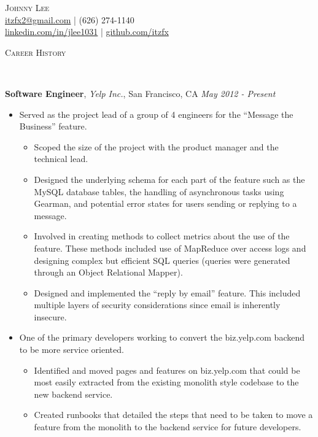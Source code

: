 \documentclass{article}
\newenvironment{changemargin}[2]{%
  \begin{list}{}{%
    \setlength{\topsep}{0pt}%
    \setlength{\leftmargin}{#1}%
    \setlength{\rightmargin}{#2}%
    \setlength{\listparindent}{\parindent}%
    \setlength{\itemindent}{\parindent}%
    \setlength{\parsep}{\parskip}%
  }%
  \item[]}{\end{list}
}
\newcommand{\lineover}{
  \begin{changemargin}{-0.05in}{-0.05in}
    \vspace*{-8pt}
    \hrulefill \\
    \vspace*{-2pt}
  \end{changemargin}
}
\newcommand{\header}[1]{
  \begin{changemargin}{-0.5in}{-0.5in}
    \scshape{#1}\\
  \lineover
  \end{changemargin}
}
\newcommand{\contact}[5]{
  \begin{changemargin}{-0.5in}{-0.5in}
    \begin{center}
      {\Large \scshape {#1}}\\ \smallskip
      {#2} | {#3}\\ \smallskip
      {#4} | {#5}\\ \smallskip
    \end{center}
  \end{changemargin}
}
\newenvironment{body} {
  \vspace*{-16pt}
  \begin{changemargin}{-0.25in}{-0.5in}
  }
  {\end{changemargin}
}
\begin{document}
\contact{Johnny Lee}
        {\href{mailto:itzfx2@gmail.com}{itzfx2@gmail.com}}
        {(626) 274-1140}
        {\href{https://www.linkedin.com/in/jlee1031}{linkedin.com/in/jlee1031}}
        {\href{https://github.com/itzfx}{github.com/itzfx}}


\header{Career History}

\begin{body}
  \vspace{14pt}
  \textbf{Software Engineer}, \emph{Yelp Inc.}, San Francisco, CA \hfill \emph{May 2012 - Present}\\
  \vspace*{-4pt}
  \begin{itemize} \itemsep -0pt  %

    \item Served as the project lead of a group of 4 engineers for the ``Message the Business'' feature.
    \begin{itemize} \itemsep -0pt
      \item Scoped the size of the project with the product manager and the technical lead.
      \item Designed the underlying schema for each part of the feature such as the MySQL database tables, the handling of asynchronous tasks using Gearman, and potential error states for users sending or replying to a message.
      \item Involved in creating methods to collect metrics about the use of the feature. These methods included use of MapReduce over access logs and designing complex but efficient SQL queries (queries were generated through an Object Relational Mapper).
      \item Designed and implemented the ``reply by email'' feature. This included multiple layers of security considerations since email is inherently insecure.
    \end{itemize}

    \item One of the primary developers working to convert the biz.yelp.com backend to be more service oriented.
    \begin{itemize} \itemsep -0pt
      \item Identified and moved pages and features on biz.yelp.com that could be most easily extracted from the existing monolith style codebase to the new backend service.
      \item Created runbooks that detailed the steps that need to be taken to move a feature from the monolith to the backend service for future developers.
    \end{itemize}


\end{itemize}
\end{body}
\end{document}
